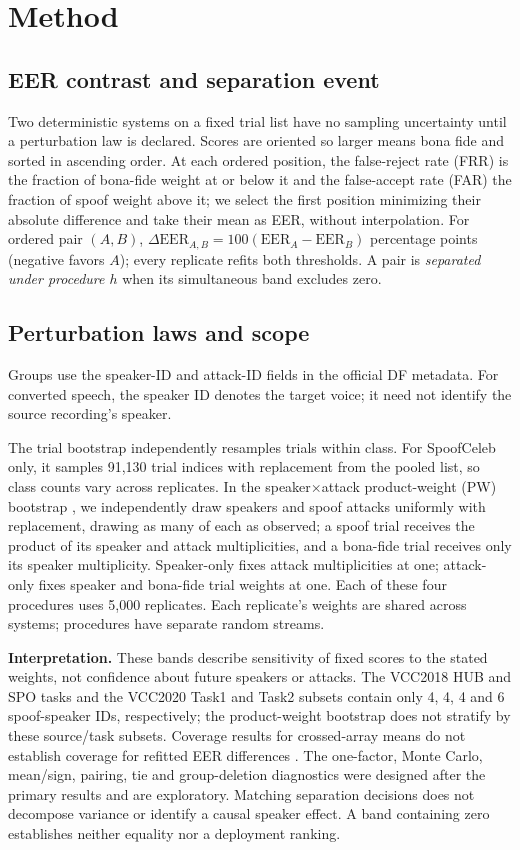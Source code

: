 \documentclass{article}
\begin{document}
\section{Method}
\label{sec:method}
\subsection{EER contrast and separation event}
\label{sec:eer}
Two deterministic systems on a fixed trial list have no sampling uncertainty until a perturbation law is declared. Scores are oriented so larger means bona fide and sorted in ascending order. At each ordered position, the false-reject rate (FRR) is the fraction of bona-fide weight at or below it and the false-accept rate (FAR) the fraction of spoof weight above it; we select the first position minimizing their absolute difference and take their mean as EER, without interpolation. For ordered pair $(A,B)$, $\Delta\mathrm{EER}_{A,B}=100(\mathrm{EER}_A-\mathrm{EER}_B)$ percentage points (negative favors $A$); every replicate refits both thresholds. A pair is \emph{separated under procedure $h$} when its simultaneous band excludes zero.

\subsection{Perturbation laws and scope}
Groups use the speaker-ID and attack-ID fields in the official DF metadata. For converted speech, the speaker ID denotes the target voice; it need not identify the source recording's speaker.

The trial bootstrap independently resamples trials within class. For SpoofCeleb only, it samples 91,130 trial indices with replacement from the pooled list, so class counts vary across replicates. In the speaker$\times$attack product-weight (PW) bootstrap \cite{owen07,oweneckles12}, we independently draw speakers and spoof attacks uniformly with replacement, drawing as many of each as observed; a spoof trial receives the product of its speaker and attack multiplicities, and a bona-fide trial receives only its speaker multiplicity. Speaker-only fixes attack multiplicities at one; attack-only fixes speaker and bona-fide trial weights at one. Each of these four procedures uses 5,000 replicates. Each replicate's weights are shared across systems; procedures have separate random streams.

\textbf{Interpretation.} These bands describe sensitivity of fixed scores to the stated weights, not confidence about future speakers or attacks. The VCC2018 HUB and SPO tasks and the VCC2020 Task1 and Task2 subsets contain only 4, 4, 4 and 6 spoof-speaker IDs, respectively; the product-weight bootstrap does not stratify by these source/task subsets. Coverage results for crossed-array means do not establish coverage for refitted EER differences \cite{oweneckles12}. The one-factor, Monte Carlo, mean/sign, pairing, tie and group-deletion diagnostics were designed after the primary results and are exploratory. Matching separation decisions does not decompose variance or identify a causal speaker effect. A band containing zero establishes neither equality nor a deployment ranking.
\end{document}
